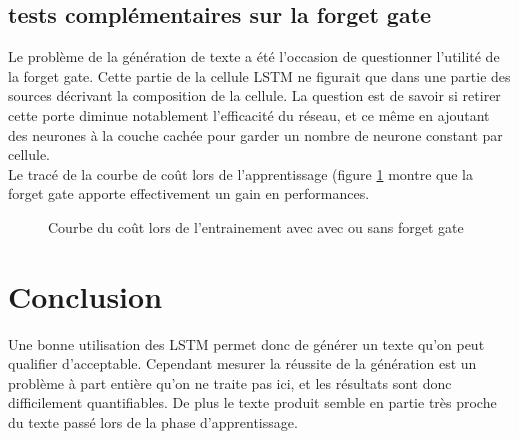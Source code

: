\subsection{tests complémentaires sur la forget gate}

Le problème de la génération de texte a été l'occasion de questionner l'utilité de la forget gate. Cette partie de la cellule LSTM ne figurait que dans une partie des sources décrivant la composition de la cellule.
La question est de savoir si retirer cette porte diminue notablement l'efficacité du réseau, et ce même en ajoutant des neurones à la couche cachée pour garder un nombre de neurone constant par cellule.
\\ Le tracé de la courbe de coût lors de l'apprentissage (figure \ref{forget_gate} montre que la forget gate apporte effectivement un gain en performances.

\begin{figure}[H]
\centering
{}
\caption{Courbe du coût lors de l'entrainement avec avec ou sans forget gate}
\label{forget_gate}
\end{figure}


\section{Conclusion}
Une bonne utilisation des LSTM permet donc de générer un texte qu'on peut qualifier d'acceptable. Cependant mesurer la réussite de la génération est un problème à part entière qu'on ne traite pas ici, et les résultats sont donc difficilement quantifiables. De plus le texte produit semble en partie très proche du texte passé lors de la phase d'apprentissage.



